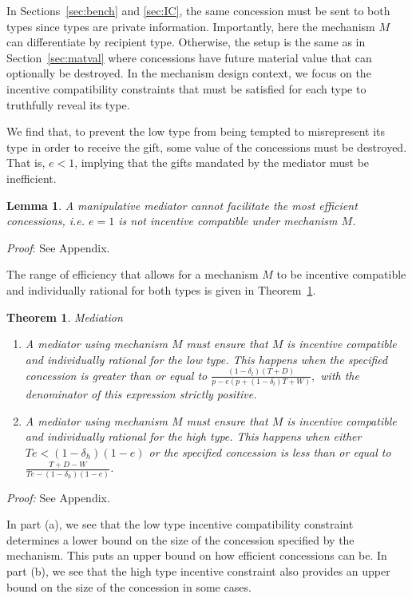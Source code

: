 \documentclass[12pt, letterpaper]{article}
\newcommand{\de}{\delta}
\newtheorem{theorem}{Theorem}
\newtheorem{lemma}{Lemma}
\begin{document}
In Sections~\ref{sec:bench} and \ref{sec:IC}, the same concession must be sent to both types since types are private information. Importantly, here the mechanism $M$ can differentiate by recipient type. Otherwise, the setup is the same as in Section~\ref{sec:matval} where concessions have future material value that can optionally be destroyed. In the mechanism design context, we focus on the incentive compatibility constraints that must be satisfied for each type to truthfully reveal its type.

We find that, to prevent the low type from being tempted to misrepresent its type in order to receive the gift, some value of the concessions must be destroyed. That is, $e<1$, implying that the gifts mandated by the mediator must be inefficient. 

\begin{lemma}
	A manipulative mediator cannot facilitate the most efficient concessions, i.e. $e=1$ is not incentive compatible under mechanism $M$. 
	\label{lemma:med}
\end{lemma}
\emph{Proof}: See Appendix.

The range of efficiency that allows for a mechanism $M$ to be incentive compatible and individually rational for both types is given in Theorem~\ref{theorem:med}.

\begin{theorem}
\emph{Mediation}
\begin{enumerate}
		\item[(a)] A mediator using mechanism $M$ must ensure that $M$ is incentive compatible and individually rational for the low type. This happens when the specified concession is greater than or equal to $\frac{\left(1 - \de_l \right)\left(T +D \right)}{p - e\left(p +(1-\de_l)T +W \right)},$ with the denominator of this expression strictly positive.
		\item[(b)] A mediator using mechanism $M$ must ensure that $M$ is incentive compatible and individually rational for the high type. This happens when either $Te < (1-\de_h)(1-e)$ or the specified concession is less than or equal to $\frac{ T + D - W}{Te - (1-\de_h)(1-e)}$.
\end{enumerate}
	\label{theorem:med}
\end{theorem}
\emph{Proof:} See Appendix.

In part (a), we see that the low type incentive compatibility constraint determines a lower bound on the size of the concession specified by the mechanism. This puts an upper bound on how efficient concessions can be. In part (b), we see that the high type incentive constraint also provides an upper bound on the size of the concession in some cases.
\end{document}

